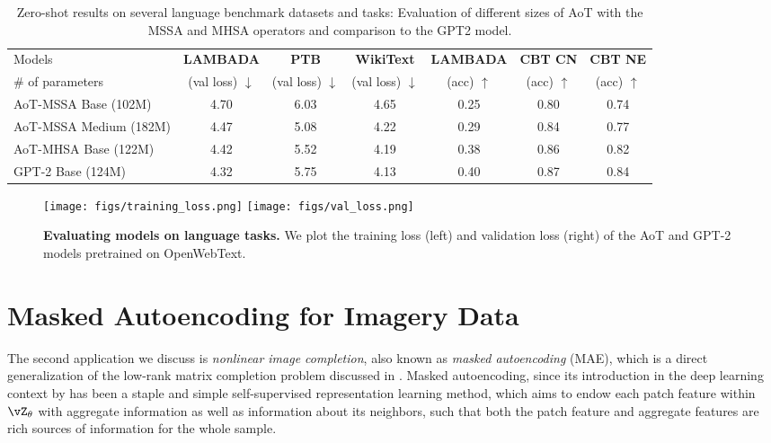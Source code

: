 \documentclass[../../book-main.tex]{subfiles}
\begin{document}
\begin{table*}[!htbp]
\caption{Zero-shot results on several language benchmark datasets and tasks: Evaluation of different sizes of AoT with the MSSA and MHSA operators and comparison to the GPT2 model.}\vskip 0.1in
\centering
\begin{small}
\begin{tabular}{l|cccccc}
\toprule
 Models  & {\bf LAMBADA} & {\bf PTB} & {\bf WikiText} & {\bf LAMBADA} & {\bf CBT CN} & {\bf CBT NE} \\
 \# of parameters  & (val loss) $\downarrow$ &  (val loss) $\downarrow$ &(val loss) $\downarrow$ & (acc) $\uparrow$ &(acc) $\uparrow$ &(acc) $\uparrow$ \\
 \midrule
 AoT-MSSA Base (102M) & 4.70 & 6.03 & 4.65 & 0.25 & 0.80 & 0.74\\
 AoT-MSSA Medium (182M) & 4.47 & 5.08 & 4.22 & 0.29 & 0.84 & 0.77 \\
 AoT-MHSA Base (122M) & 4.42 & 5.52 & 4.19 & 0.38 & 0.86 & 0.82\\
 GPT-2 Base (124M) & 4.32 & 5.75 & 4.13 &  0.40 &  0.87 &  0.84 \\
\bottomrule
\end{tabular}
\label{tab:zeroshot}
\end{small}
\end{table*} 
\vspace{-0.05in} 


\begin{figure*}[t]
\begin{center}
\texttt{[image: figs/training\_loss.png]} \hspace{0.4in}
\texttt{[image: figs/val\_loss.png]}
    \vspace{-0.15in}
\caption{\centering \textbf{Evaluating models on language tasks.} We plot the training loss (left) and validation loss (right) of the AoT and GPT-2 models pretrained on OpenWebText.}  \label{fig:loss} 
\end{center}
\vspace{-0.15in}
\end{figure*} 




 

\section{Masked Autoencoding for Imagery Data}\label{sec:image_completion}

The second application we discuss is \textit{nonlinear image completion}, also known as \textit{masked autoencoding} (MAE), which is a direct generalization of the low-rank matrix completion problem discussed in . Masked autoencoding, since its introduction in the deep learning context by \cite{he2022masked} has been a staple and simple self-supervised representation learning method, which aims to endow each patch feature within \(\vZ_{\theta}\) with aggregate information as well as information about its neighbors, such that both the patch feature and aggregate features are rich sources of information for the whole sample. 
\end{document}
